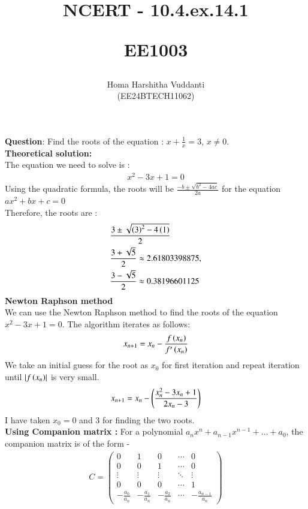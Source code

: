 \documentclass[journal]{IEEEtran}
\begin{document}


\title{
NCERT - 10.4.ex.14.1

\large{EE1003}
}
\author{Homa Harshitha Vuddanti

(EE24BTECH11062)
}	

\maketitle

\bigskip

\renewcommand{\thefigure}{\theenumi}
\renewcommand{\thetable}{\theenumi}
\textbf{Question}: Find the roots of the equation : $x+\frac{1}{x}=3$, $x\neq 0$.\\
\textbf{Theoretical solution: }\\
The equation we need to solve is :
\begin{align}
    x^2-3x+1=0
\end{align}
Using the quadratic formula, the roots will be $\frac{-b\pm \sqrt{b^2-4ac}}{2a}$ for the equation $ax^2+bx+c=0$\\
Therefore, the roots are :
\begin{align}
    &\frac{3\pm \sqrt{\left(3\right)^2-4\left(1\right)}}{2}\\
    &\frac{3+\sqrt{5}}{2}\approx 2.61803398875,\\
    &\frac{3-\sqrt{5}}{2} \approx 0.38196601125
\end{align}
\textbf{Newton Raphson method}\\
We can use the Newton Raphson method to find the roots of the equation $x^2-3x+1=0$. The algorithm iterates as follows:
\begin{align}
x_{n+1}=x_n-\frac{f\left(x_n\right)}{f^\prime\left(x_n\right)}
\end{align}
We take an initial guess for the root as $x_0$ for first iteration and repeat iteration until $\left\vert f\left(x_n\right)\right\vert$ is very small.
\begin{align}
x_{n+1}=x_n-\left(\frac{x_n^2-3x_n+1}{2x_n-3}\right)
\end{align}
I have taken $x_0=0$ and $3$ for finding the two roots. \\
\textbf{Using Companion matrix :}
For a polynomial $a_nx^n+a_{n-1}x^{n-1}+\dots +a_0$, the companion matrix is of the form -\\
\begin{align}
C=
\begin{pmatrix}
0 & 1 & 0 & \cdots & 0 \\
0 & 0 & 1 & \cdots & 0 \\
\vdots & \vdots & \vdots & \ddots & \vdots \\
0 & 0 & 0 & \cdots & 1 \\
-\frac{a_0}{a_n} & -\frac{a_1}{a_n} & -\frac{a_2}{a_n} & \cdots & -\frac{a_{n-1}}{a_n}
\end{pmatrix}
\end{align}
\end{document}
